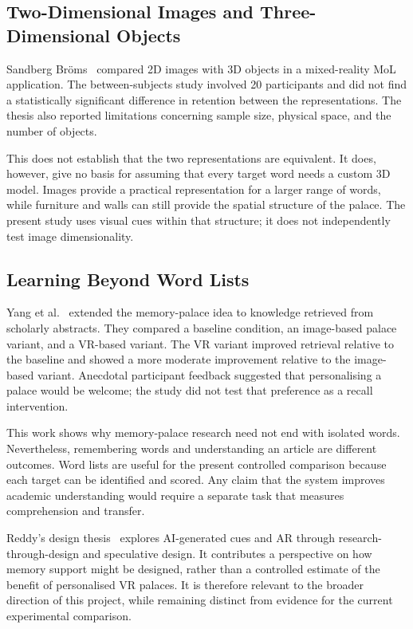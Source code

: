 \subsection{Two-Dimensional Images and Three-Dimensional Objects}
Sandberg Br\"oms~\cite{broms2024} compared 2D images with 3D objects in a mixed-reality MoL application. The between-subjects study involved 20 participants and did not find a statistically significant difference in retention between the representations. The thesis also reported limitations concerning sample size, physical space, and the number of objects.

This does not establish that the two representations are equivalent. It does, however, give no basis for assuming that every target word needs a custom 3D model. Images provide a practical representation for a larger range of words, while furniture and walls can still provide the spatial structure of the palace. The present study uses visual cues within that structure; it does not independently test image dimensionality.

\subsection{Learning Beyond Word Lists}
Yang et al.~\cite{yang2021} extended the memory-palace idea to knowledge retrieved from scholarly abstracts. They compared a baseline condition, an image-based palace variant, and a VR-based variant. The VR variant improved retrieval relative to the baseline and showed a more moderate improvement relative to the image-based variant. Anecdotal participant feedback suggested that personalising a palace would be welcome; the study did not test that preference as a recall intervention.

This work shows why memory-palace research need not end with isolated words. Nevertheless, remembering words and understanding an article are different outcomes. Word lists are useful for the present controlled comparison because each target can be identified and scored. Any claim that the system improves academic understanding would require a separate task that measures comprehension and transfer.

Reddy's design thesis~\cite{reddy2025} explores AI-generated cues and AR through research-through-design and speculative design. It contributes a perspective on how memory support might be designed, rather than a controlled estimate of the benefit of personalised VR palaces. It is therefore relevant to the broader direction of this project, while remaining distinct from evidence for the current experimental comparison.

